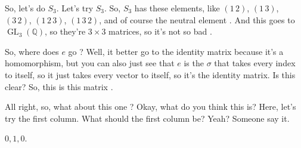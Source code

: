 \begin{speech}[00:14:18 - 00:15:36]
So, let's do $S_3$. Let's try $S_3$. So, $S_3$ has these elements, like $(1\,2)$, $(1\,3)$, $(3\,2)$, $(1\,2\,3)$, $(1\,3\,2)$, and of course the neutral element . And this goes to $\operatorname{GL}_3(\mathbb{Q})$, so they're $3 \times 3$ matrices, so it's not so bad .

So, where does $e$ go ? Well, it better go to the identity matrix because it's a homomorphism, but you can also just see that $e$ is the $\sigma$ that takes every index to itself, so it just takes every vector to itself, so it's the identity matrix. Is this clear? So, this is this matrix .

All right, so, what about this one ? Okay, what do you think this is? Here, let's try the first column. What should the first column be? Yeah? Someone say it.
\end{speech}

\begin{student}
$0, 1, 0$.
\end{student}


